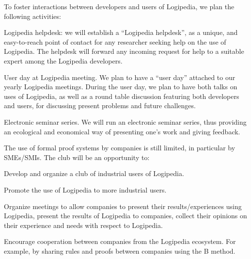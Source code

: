 \begin{workpackage}[id=dissemination,type=MGT,wphases=1-48,
  short={Dissemination},
  title={Dissemination, communication and exploitation},
  lead=Lie,LieRM=2,InrRM=6,BirRM=4,CleRM=2,ImtRM=2,StrRM=2,ZibRM=14,EduRM=12]
\begin{tasklist}
  \begin{task}[id=researchers-club,
      title=Expanding the use of Logipedia in research,
      lead=Bir,BirRM=2,wphases=1-48!.05]
     To foster interactions between developers and users of Logipedia, we plan the following activities:
    \begin{compactitem}
     \item Logipedia helpdesk:
    we will establish a ``Logipedia helpdesk'', as a unique, and easy-to-reach point of contact for any researcher seeking help on the use of Logipedia.
     The helpdesk will forward any incoming request for help to a suitable expert among the Logipedia developers.
     \item User day at Logipedia meeting.
     We plan to have a ``user day'' attached to our yearly Logipedia meetings.
     During the user day, we plan to have both talks on uses of Logipedia, as well as a round table discussion featuring both developers and users, for discussing present problems and future challenges.
     \item Electronic seminar series.
     We will run an electronic seminar series, thus providing an ecological and economical way of presenting one's work and giving feedback.
    \end{compactitem}
  \end{task}

  \begin{task}[id=industrial-club,
    title=Expanding the use of Logipedia in the industry,
    lead=Inr,InrRM=2,wphases=1-48!.05]

    The use of formal proof systems by companies is still limited, in particular by SMEs/SMIs. The club will be an opportunity to:
    \begin{compactitem}
    \item Develop and organize a club of industrial users of Logipedia.
    \item Promote the use of Logipedia to more industrial users.
    \item Organize meetings to allow companies to present their results/experiences using Logipedia, present the results of Logipedia to companies, collect their opinions on their experience and needs with respect to Logipedia.
    \item Encourage cooperation between companies from the Logipedia
      ecosystem. For example, by sharing rules and proofs between companies using the B method.
    \end{compactitem}
  \end{task}


\end{tasklist}
\end{workpackage}
